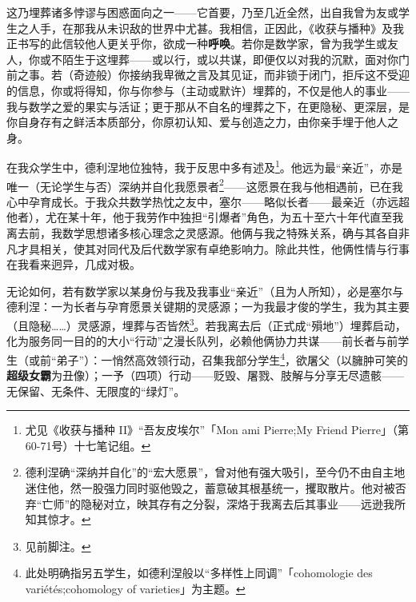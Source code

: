这乃埋葬诸多悖谬与困惑面向之一——它首要，乃至几近全然，出自我曾为友或学生之人手，在那我从未识敌的世界中尤甚。我相信，正因此，《收获与播种》及我正书写的此信较他人更关乎你，欲成一种\textbf{呼唤}。若你是数学家，曾为我学生或友人，你或不陌生于这埋葬——或以行，或以共谋，即便仅以对我的沉默，面对你门前之事。若（奇迹般）你接纳我卑微之言及其见证，而非锁于闭门，拒斥这不受迎的信息，你或将得知，你与你参与（主动或默许）埋葬的，不仅是他人的事业——我与数学之爱的果实与活证；更于那从不自名的埋葬之下，在更隐秘、更深层，是你自身存有之鲜活本质部分，你原初认知、爱与创造之力，由你亲手埋于他人之身。

在我众学生中，德利涅地位独特，我于反思中多有述及\footnote{尤见《收获与播种 II》“吾友皮埃尔”「Mon ami Pierre;My Friend Pierre」（第60-71号）十七笔记组。}。他远为最“亲近”，亦是唯一（无论学生与否）深纳并自化我愿景者\footnote{德利涅确“深纳并自化”的“宏大愿景”，曾对他有强大吸引，至今仍不由自主地迷住他，然一股强力同时驱他毁之，蓄意破其根基统一，攫取散片。他对被否弃“亡师”的隐秘对立，映其存有之分裂，深烙于我离去后其事业——远逊我所知其惊才。}——这愿景在我与他相遇前，已在我心中孕育成长。于我众共数学热忱之友中，塞尔——略似长者——最亲近（亦远超他者），尤在某十年，他于我劳作中独担“引爆者”角色，为五十至六十年代直至我离去前，我数学思想诸多核心理念之灵感源。他俩与我之特殊关系，确与其各自非凡才具相关，使其对同代及后代数学家有卓绝影响力。除此共性，他俩性情与行事在我看来迥异，几成对极。

无论如何，若有数学家以某身份与我及我事业“亲近”（且为人所知），必是塞尔与德利涅：一为长者与孕育愿景关键期的灵感源；一为我最才俊的学生，我为其主要（且隐秘……）灵感源，埋葬与否皆然\footnote{见前脚注。}。若我离去后（正式成“殞地”）埋葬启动，化为服务同一目的的大小“行动”之漫长队列，必赖他俩协力共谋——前长者与前学生（或前“弟子”）：一悄然高效领行动，召集我部分学生\footnote{此处明确指另五学生，如德利涅般以“多样性上同调”「cohomologie des variétés;cohomology of varieties」为主题。}，欲屠父（以臃肿可笑的\textbf{超级女霸}为丑像）；一予（四项）行动——贬毁、屠戮、肢解与分享无尽遗骸——无保留、无条件、无限度的“绿灯”。